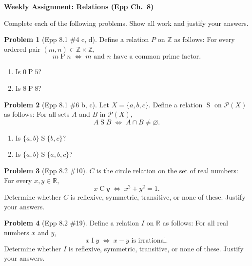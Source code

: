 \documentclass[11pt]{article}
\newcommand{\Z}{\mathbb{Z}}
\newcommand{\R}{\mathbb{R}}
\newcommand{\pow}{\mathscr{P}}
\begin{document}
\begin{center}
  {\Large\bfseries Weekly Assignment: Relations (Epp Ch.\ 8)}
\end{center}

\bigskip

\noindent
Complete each of the following problems.  Show all work and justify your answers.

\bigskip

\noindent\textbf{Problem 1} (Epp 8.1 \#4 c, d). \;
Define a relation $P$ on $\Z$ as follows: For every ordered pair $(m, n) \in \Z \times \Z$,
\[
  m \mathrel{P} n \;\iff\; m \text{ and } n \text{ have a common prime factor.}
\]

\begin{enumerate}[label=\alph*., start=3]
  \item Is $0 \mathrel{P} 5$?
  \item Is $8 \mathrel{P} 8$?
\end{enumerate}

\bigskip

\noindent\textbf{Problem 2} (Epp 8.1 \#6 b, c). \;
Let $X = \{a, b, c\}$.  Define a relation $\mathrel{S}$ on $\pow(X)$ as follows:
For all sets $A$ and $B$ in $\pow(X)$,
\[
  A \mathrel{S} B \;\iff\; A \cap B \neq \varnothing.
\]

\begin{enumerate}[label=\alph*., start=2]
  \item Is $\{a, b\} \mathrel{S} \{b, c\}$?
  \item Is $\{a, b\} \mathrel{S} \{a, b, c\}$?
\end{enumerate}

\bigskip

\noindent\textbf{Problem 3} (Epp 8.2 \#10). \;
$C$ is the circle relation on the set of real numbers:
For every $x, y \in \R$,
\[
  x \mathrel{C} y \;\iff\; x^{2} + y^{2} = 1.
\]
Determine whether $C$ is reflexive, symmetric, transitive, or none of these.
Justify your answers.

\bigskip

\noindent\textbf{Problem 4} (Epp 8.2 \#19). \;
Define a relation $I$ on $\R$ as follows: For all real numbers $x$ and $y$,
\[
  x \mathrel{I} y \;\iff\; x - y \text{ is irrational.}
\]
Determine whether $I$ is reflexive, symmetric, transitive, or none of these.
Justify your answers.
\end{document}
